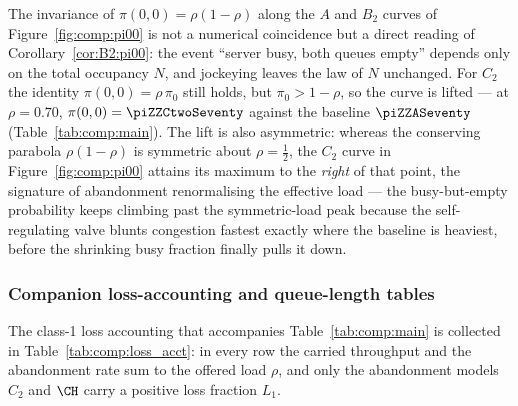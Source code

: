 The invariance of $\pi(0,0)=\rho(1-\rho)$ along the $A$ and $B_2$ curves of
Figure~\ref{fig:comp:pi00} is not a numerical coincidence but a direct reading of
Corollary~\ref{cor:B2:pi00}: the event ``server busy, both queues empty'' depends only on
the total occupancy $N$, and jockeying leaves the law of $N$ unchanged. For $C_2$ the
identity $\pi(0,0)=\rho\,\pi_0$ still holds, but $\pi_0>1-\rho$, so the curve is lifted ---
at $\rho=0.70$, $\pi(0,0)=\piZZCtwoSeventy$ against the baseline $\piZZASeventy$
(Table~\ref{tab:comp:main}). The lift is also asymmetric: whereas the conserving parabola
$\rho(1-\rho)$ is symmetric about $\rho=\tfrac12$, the $C_2$ curve in
Figure~\ref{fig:comp:pi00} attains its maximum to the \emph{right} of that point, the
signature of abandonment renormalising the effective load --- the busy-but-empty probability
keeps climbing past the symmetric-load peak because the self-regulating valve blunts
congestion fastest exactly where the baseline is heaviest, before the shrinking busy fraction
finally pulls it down.

\subsubsection{Companion loss-accounting and queue-length tables}

The class-1 loss accounting that accompanies Table~\ref{tab:comp:main} is collected in
Table~\ref{tab:comp:loss_acct}: in every row the carried throughput and the abandonment
rate sum to the offered load $\rho$, and only the abandonment models $C_2$ and $\CH$ carry a
positive loss fraction $L_1$.

